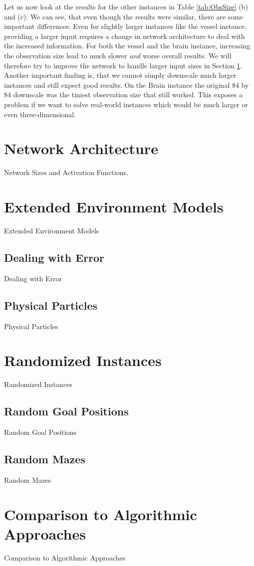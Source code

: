 Let us now look at the results for the other instances in Table \ref{tab:ObsSize} (b) and (c). We can see, that even though the results were similar, there are some important differences: Even for slightly larger instances like the vessel instance, providing a larger input requires a change in network architecture to deal with the increased information. For both the vessel and the brain instance, increasing the observation size lead to much slower \textit{and} worse overall results. We will therefore try to improve the network to handle larger input sizes in Section \ref{sec:EvalNetworks}. Another important finding is, that we cannot simply downscale much larger instances and still expect good results. On the Brain instance the original 84 by 84 downscale was the tiniest observation size that still worked. This exposes a problem if we want to solve real-world instances which would be much larger or even three-dimensional. 

\section{Network Architecture} \label{sec:EvalNetworks}
Network Sizes and Activation Functions.

\section{Extended Environment Models} \label{sec:EvalExtendedModels}
Extended Environment Models
\subsection{Dealing with Error} \label{sec:EvalError}
Dealing with Error
\subsection{Physical Particles} \label{sec:EvalPhysical}
Physical Particles
\section{Randomized Instances} \label{sec:EvalRandomness}
Randomized Instances
\subsection{Random Goal Positions} \label{sec:EvalRandomGoals}
Random Goal Positions
\subsection{Random Mazes} \label{sec:EvalRandomMaze}
Random Mazes
\section{Comparison to Algorithmic Approaches} \label{sec:EvalAlgorithms}
Comparison to Algorithmic Approaches